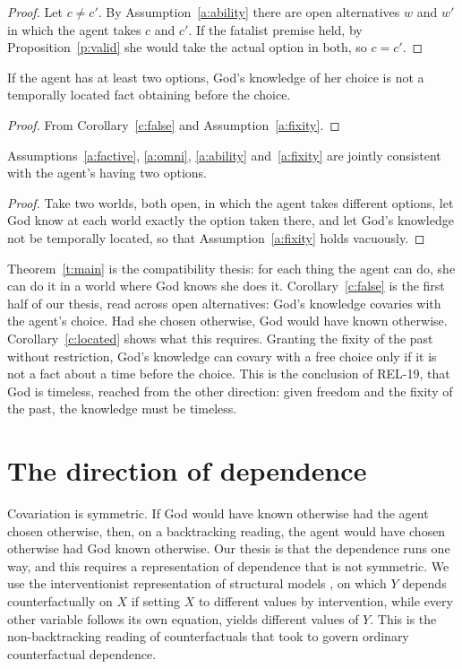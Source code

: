 \documentclass{situationist-preprint}
\begin{document}
\begin{proof}
Let $c \neq c'$. By Assumption~\ref{a:ability} there are open alternatives $w$ and $w'$ in which the agent takes $c$ and $c'$. If the fatalist premise held, by Proposition~\ref{p:valid} she would take the actual option in both, so $c = c'$.
\end{proof}

\begin{corollary}\label{c:located}
If the agent has at least two options, God's knowledge of her choice is not a temporally located fact obtaining before the choice.
\end{corollary}

\begin{proof}
From Corollary~\ref{c:false} and Assumption~\ref{a:fixity}.
\end{proof}

\begin{proposition}\label{p:consistent}
Assumptions~\ref{a:factive}, \ref{a:omni}, \ref{a:ability} and~\ref{a:fixity} are jointly consistent with the agent's having two options.
\end{proposition}

\begin{proof}
Take two worlds, both open, in which the agent takes different options, let God know at each world exactly the option taken there, and let God's knowledge not be temporally located, so that Assumption~\ref{a:fixity} holds vacuously.
\end{proof}

Theorem~\ref{t:main} is the compatibility thesis: for each thing the agent can do, she can do it in a world where God knows she does it. Corollary~\ref{c:false} is the first half of our thesis, read across open alternatives: God's knowledge covaries with the agent's choice. Had she chosen otherwise, God would have known otherwise. Corollary~\ref{c:located} shows what this requires. Granting the fixity of the past without restriction, God's knowledge can covary with a free choice only if it is not a fact about a time before the choice. This is the conclusion of REL-19, that God is timeless, reached from the other direction: given freedom and the fixity of the past, the knowledge must be timeless.

\section{The direction of dependence}

Covariation is symmetric. If God would have known otherwise had the agent chosen otherwise, then, on a backtracking reading, the agent would have chosen otherwise had God known otherwise. Our thesis is that the dependence runs one way, and this requires a representation of dependence that is not symmetric. We use the interventionist representation of structural models \citep{Pearl2009}, on which $Y$ depends counterfactually on $X$ if setting $X$ to different values by intervention, while every other variable follows its own equation, yields different values of $Y$. This is the non-backtracking reading of counterfactuals that \citet{Lewis1979} took to govern ordinary counterfactual dependence.
\end{document}
